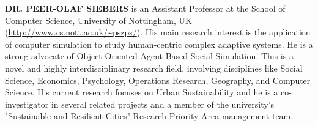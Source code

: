 \documentclass{bmcart}
\begin{document}
\begin{backmatter}
\textbf{\uppercase{Dr. PEER-OLAF SIEBERS}} is an Assistant Professor at the School of Computer Science, University of Nottingham, UK (\url{http://www.cs.nott.ac.uk/~pszps/}). His main research interest is the application of computer simulation to study human-centric complex adaptive systems. He is a strong advocate of Object Oriented Agent-Based Social Simulation. This is a novel and highly interdisciplinary research field, involving disciplines like Social Science, Economics, Psychology, Operations Research, Geography, and Computer Science. His current research focuses on Urban Sustainability and he is a co-investigator in several related projects and a member of the university's "Sustainable and Resilient Cities" Research Priority Area management team.






\end{backmatter}
\end{document}
